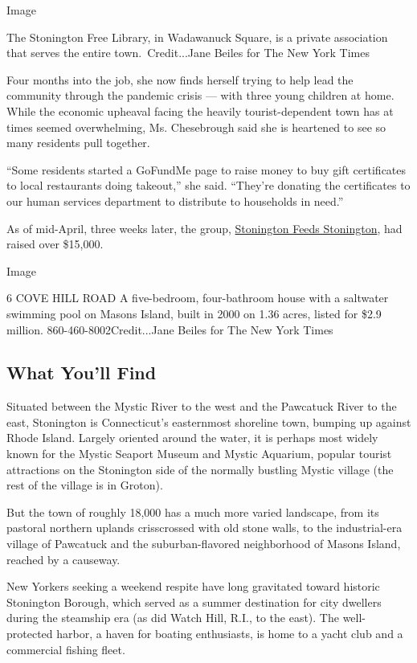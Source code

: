 Image

The Stonington Free Library, in Wadawanuck Square, is a private
association that serves the entire town.~Credit...Jane Beiles for The
New York Times

Four months into the job, she now finds herself trying to help lead the
community through the pandemic crisis --- with three young children at
home. While the economic upheaval facing the heavily tourist-dependent
town has at times seemed overwhelming, Ms. Chesebrough said she is
heartened to see so many residents pull together.

``Some residents started a GoFundMe page to raise money to buy gift
certificates to local restaurants doing takeout,'' she said. ``They're
donating the certificates to our human services department to distribute
to households in need.''

As of mid-April, three weeks later, the group,
\href{https://www.facebook.com/groups/2583619385099118/}{Stonington
Feeds Stonington}, had raised over \$15,000.

Image

6 COVE HILL ROAD \textbar{} A five-bedroom, four-bathroom house with a
saltwater swimming pool on Masons Island, built in 2000 on 1.36 acres,
listed for \$2.9 million. 860-460-8002Credit...Jane Beiles for The New
York Times

\hypertarget{what-youll-find}{%
\subsection{What You'll Find}\label{what-youll-find}}

Situated between the Mystic River to the west and the Pawcatuck River to
the east, Stonington is Connecticut's easternmost shoreline town,
bumping up against Rhode Island. Largely oriented around the water, it
is perhaps most widely known for the Mystic Seaport Museum and Mystic
Aquarium, popular tourist attractions on the Stonington side of the
normally bustling Mystic village (the rest of the village is in Groton).

But the town of roughly 18,000 has a much more varied landscape, from
its pastoral northern uplands crisscrossed with old stone walls, to the
industrial-era village of Pawcatuck and the suburban-flavored
neighborhood of Masons Island, reached by a causeway.

New Yorkers seeking a weekend respite have long gravitated toward
historic Stonington Borough, which served as a summer destination for
city dwellers during the steamship era (as did Watch Hill, R.I., to the
east). The well-protected harbor, a haven for boating enthusiasts, is
home to a yacht club and a commercial fishing fleet.


